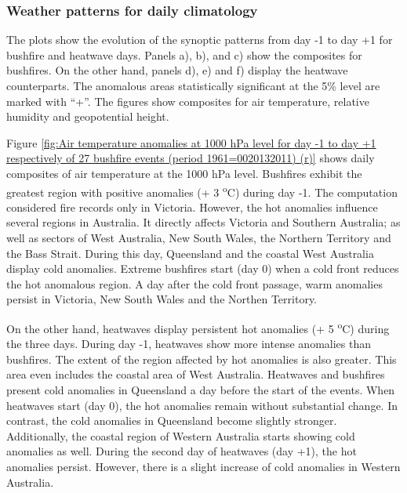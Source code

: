 \subsubsection{Weather patterns for daily climatology}

The plots show the evolution of the synoptic patterns from day -1
to day +1 for bushfire and heatwave days. Panels a), b), and c) show
the composites for bushfires. On the other hand, panels d), e) and
f) display the heatwave counterparts. The anomalous areas statistically
significant at the 5\% level are marked with ``+''. The figures
show composites for air temperature, relative humidity and geopotential
height.

Figure \ref{fig:Air temperature anomalies at 1000 hPa level for day -1 to day +1 respectively of 27 bushfire events (period 1961=0020132011) (r)}
shows daily composites of air temperature at the 1000 hPa level. Bushfires
exhibit the greatest region with positive anomalies (+ 3 \textsuperscript{o}C)
during day -1. The computation considered fire records only in Victoria.
However, the hot anomalies influence several regions in Australia.
It directly affects Victoria and Southern Australia; as well as sectors
of West Australia, New South Wales, the Northern Territory and the
Bass Strait. During this day, Queensland and the coastal West Australia
display cold anomalies. Extreme bushfires start (day 0) when a cold
front reduces the hot anomalous region. A day after the cold front
passage, warm anomalies persist in Victoria, New South Wales and the
Northen Territory.

On the other hand, heatwaves display persistent hot anomalies (+ 5
\textsuperscript{o}C) during the three days. During day -1, heatwaves
show more intense anomalies than bushfires. The extent of the region
affected by hot anomalies is also greater. This area even includes
the coastal area of West Australia. Heatwaves and bushfires present
cold anomalies in Queensland a day before the start of the events.
When heatwaves start (day 0), the hot anomalies remain without substantial
change. In contrast, the cold anomalies in Queensland become slightly
stronger. Additionally, the coastal region of Western Australia starts
showing cold anomalies as well. During the second day of heatwaves
(day +1), the hot anomalies persist. However, there is a slight increase
of cold anomalies in Western Australia.

